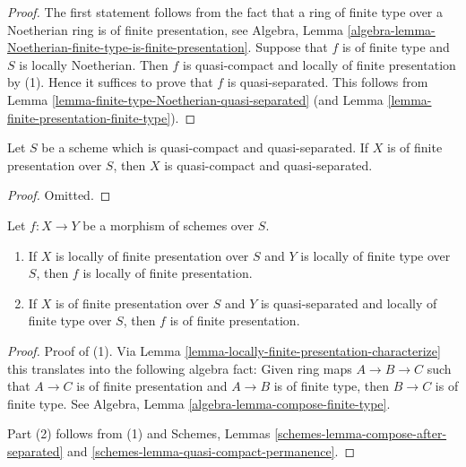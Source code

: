 \begin{proof}
The first statement follows from the fact that a ring
of finite type over a Noetherian ring is of finite presentation, see Algebra,
Lemma \ref{algebra-lemma-Noetherian-finite-type-is-finite-presentation}.
Suppose that $f$ is of finite type and $S$ is locally Noetherian.
Then $f$ is quasi-compact and locally of finite presentation by (1).
Hence it suffices to prove that $f$ is quasi-separated.
This follows from Lemma \ref{lemma-finite-type-Noetherian-quasi-separated}
(and Lemma \ref{lemma-finite-presentation-finite-type}).
\end{proof}

\begin{lemma}
\label{lemma-finite-presentation-quasi-compact-quasi-separated}
Let $S$ be a scheme which is quasi-compact and quasi-separated.
If $X$ is of finite presentation over $S$, then $X$ is quasi-compact
and quasi-separated.
\end{lemma}

\begin{proof}
Omitted.
\end{proof}

\begin{lemma}
\label{lemma-finite-presentation-permanence}
Let $f : X \to Y$ be a morphism of schemes over $S$.
\begin{enumerate}
\item If $X$ is locally of finite presentation over $S$ and
$Y$ is locally of finite type over $S$, then $f$ is locally
of finite presentation.
\item If $X$ is of finite presentation over $S$ and $Y$ is quasi-separated
and locally of finite type over $S$, then $f$ is of finite presentation.
\end{enumerate}
\end{lemma}

\begin{proof}
Proof of (1). Via Lemma \ref{lemma-locally-finite-presentation-characterize}
this translates into the following algebra
fact: Given ring maps $A \to B \to C$ such that $A \to C$ is
of finite presentation and $A \to B$ is of finite type,
then $B \to C$ is of finite type. See
Algebra, Lemma \ref{algebra-lemma-compose-finite-type}.

\medskip\noindent
Part (2) follows from (1) and
Schemes, Lemmas \ref{schemes-lemma-compose-after-separated} and
\ref{schemes-lemma-quasi-compact-permanence}.
\end{proof}


